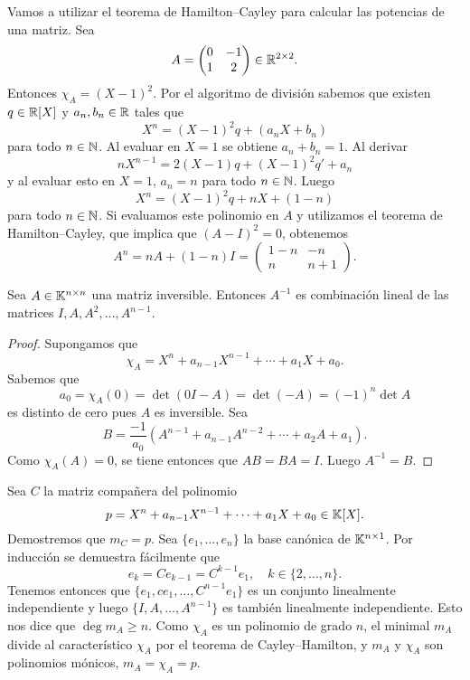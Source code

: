 \begin{example}
	Vamos a utilizar el teorema de Hamilton--Cayley para calcular 
	las potencias de una matriz. Sea 
	\[
		A=\begin{pmatrix}
		0 & -1\\
		1 & 2
	\end{pmatrix}\in\mathbb{R}^{2\times2}.
	\]
	Entonces $\chi_A=(X-1)^2$. Por el algoritmo de división sabemos que existen $q\in\mathbb{R}[X]$ y $a_{n},b_n\in\mathbb{R}$ tales que
	\[
		X^n=(X-1)^2q+(a_nX+b_n)
	\]
	para todo $n\in\mathbb{N}$. Al evaluar en $X=1$ se obtiene $a_n+b_n=1$. Al derivar 
	\[
		nX^{n-1}=2(X-1)q+(X-1)^2q'+a_n
	\]
	y al evaluar esto en $X=1$, $a_n=n$ para todo $n\in\mathbb{N}$. Luego
	\[
		X^n=(X-1)^2q+nX+(1-n)
	\]
	para todo $n\in\mathbb{N}$. Si evaluamos este polinomio en $A$ y utilizamos el teorema de 
	Hamilton--Cayley, que implica que $(A-I)^2=0$, obtenemos 
	\[
		A^n=nA+(1-n)I=\begin{pmatrix}
			1-n & -n\\
			n & n+1
		\end{pmatrix}.
	\]
\end{example}

\begin{cor}
	Sea $A\in\mathbb{K}^{n\times n}$ una matriz inversible. Entonces $A^{-1}$ es
	combinación lineal de las matrices $I,A,A^2,\dots,A^{n-1}$.

	\begin{proof}
		Supongamos que \[
			\chi_A=X^n+a_{n-1}X^{n-1}+\cdots+a_1X+a_0.
		\]
		Sabemos que
		\[
			a_0=\chi_A(0)=\det(0I-A)=\det(-A)=(-1)^n\det A
		\]
		es distinto de cero pues $A$ es inversible. Sea 
		\[
		B=\frac{-1}{a_0}\left(A^{n-1}+a_{n-1}A^{n-2}+\cdots+a_2A+a_1\right).
		\]
		Como $\chi_A(A)=0$, se tiene entonces que $AB=BA=I$. Luego $A^{-1}=B$.
	\end{proof}
\end{cor}

\begin{example}
	Sea $C$ la matriz compañera del polinomio
	\[
		p=X^n+a_{n-1}X^{n-1}+\cdots+a_1X+a_0\in\mathbb{K}[X].
	\]
	Demostremos que $m_C=p$. Sea $\{e_1,\dots,e_{n}\}$ la base canónica de
	$\mathbb{K}^{n\times1}$. Por inducción se demuestra fácilmente que
	\[
		e_k=Ce_{k-1}=C^{k-1}e_1,\quad
		k\in\{2,\dots,n\}.
	\]
	Tenemos entonces que $\{e_1,ce_1,\dots,C^{n-1}e_1\}$ es un conjunto
	linealmente independiente y luego $\{I,A,\dots,A^{n-1}\}$ es también
	linealmente independiente. Esto nos dice que $\deg m_A\geq n$. Como
	$\chi_A$ es un polinomio de grado $n$, el minimal $m_A$ divide al
	característico $\chi_A$ por el teorema de Cayley--Hamilton, y $m_A$ y
	$\chi_A$ son polinomios mónicos, $m_A=\chi_A=p$.
%	
\end{example}

